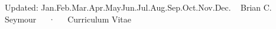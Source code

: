 \documentclass[11pt, letterpaper]{awesome-cv-edited}
\newcommand{\shortmonthnamee}[1]{%
  \ifcase#1%
  \or Jan.\or Feb.\or Mar.\or Apr.\or May\or Jun.\or Jul.\or Aug.\or Sep.\or Oct.\or Nov.\or Dec.%
  \fi%
}
\renewcommand{\today}{%
  \shortmonthnamee{\month}~\twodigit{\day} \the\year%
}
\begin{document}
\makecvheader[L]

\makecvfooter
  {Updated: \today}
  {Brian C. Seymour~~~·~~~Curriculum Vitae}
  {\thepage}









% 
% 


\end{document}
